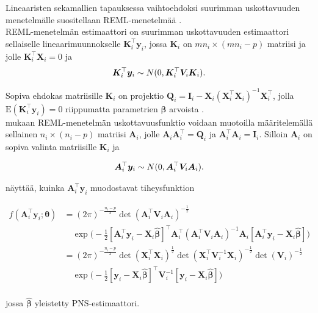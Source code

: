 \documentclass[finnish]{docopts}
\begin{document}
Lineaaristen sekamallien tapauksessa vaihtoehdoksi suurimman uskottavuuden menetelmälle suositellaan REML-menetelmää \cite{diggle02, pinheiro00, verbeke00}.\\

REML-menetelmän estimaattori on suurimman uskottavuuden estimaattori sellaiselle lineaarimuunnokselle $\bm{K}_{i}^\top \bm{y}_i$, jossa $\bm{K}_i$ on $mn_{i} \times (mn_{i} - p)$ matriisi ja jolle $\bm{K}_{i}^\top \bm{X}_i = 0$ ja 
$$
\bm{K}_{i}^\top \bm{y}_i \sim N(0, \bm{K}_{i}^\top \bm{V}_i \bm{K}_{i}).\\
$$


Sopiva ehdokas matriisille $\bm{K}_{i}$ on projektio $\bm{Q}_i = \bm{I}_i - \bm{X}_i(\bm{X}_i^\top \bm{X}_i)^{-1} \bm{X}_i^\top$, jolla $\text{E}(\bm{K}_{i}^\top \bm{y}_i) = 0$ riippumatta parametrien $\bm{\beta}$ arvoista \cite{diggle02}. \\

\cite{nissinen09} mukaan REML-menetelmän uskottavuusfunktio voidaan muotoilla määritelemällä sellainen $n_i \times (n_i - p)$ matriisi $\bm{A}_i$, jolle $\bm{A}_i \bm{A}_i^\top = \bm{Q}_i$ ja $\bm{A}_{i}^\top \bm{A}_i = \bm{I}_i$. Silloin $\bm{A}_i$ on sopiva valinta matriisille $\bm{K}_i$ ja 

$$
\bm{A}_{i}^\top \bm{y}_i \sim N(0, \bm{A}_{i}^\top \bm{V}_i \bm{A}_{i}).\\
$$

\cite{nissinen09} näyttää, kuinka $\bm{A}_{i}^\top \bm{y}_i$ muodostavat tiheysfunktion

$$
\begin{aligned}
f(\bm{A}_{i}^\top \bm{y}_i;\bm{\theta}) &= (2\pi)^{-\frac{n_{i}-p}{2}} \det (\bm{A}_{i}^\top \bm{V}_i \bm{A}_{i})^{-\frac{1}{2}} \\
&\quad \exp \big( -\frac{1}{2} [\bm{A}_{i}^\top \bm{y}_i - \bm{X}_i \bm{\hat{\beta}}]^\top \bm{A}_{i}^\top(\bm{A}_{i}^\top \bm{V}_i \bm{A}_{i})^{-1} \bm{A}_{i} [\bm{A}_{i}^\top \bm{y}_i - \bm{X}_i \hat{\bm{\beta}}]\big) \\
&= (2\pi)^{-\frac{n_{i}-p}{2}} \det(\bm{X}_{i}^\top \bm{X}_i)^{\frac{1}{2}} \det (\bm{X}_{i}^\top \bm{V}_{i}^{-1} \bm{X}_{i})^{-\frac{1}{2}} \det(\bm{V}_{i})^{-\frac{1}{2}} \\
&\quad \exp \big( -\frac{1}{2} [\bm{y}_i - \bm{X}_i \bm{\hat{\beta}}]^\top \bm{V}_{i}^{-1} [\bm{y}_i - \bm{X}_i \hat{\bm{\beta}}]\big) \\
\end{aligned}
$$

jossa $\bm{\hat{\beta}}$ yleistetty PNS-estimaattori.\\ 
\end{document}

